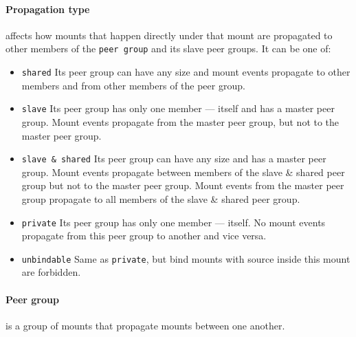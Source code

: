 \documentclass[licencjacka,en]{pracamgr}
\begin{document}
\paragraph{Propagation type} affects how mounts that happen directly under that mount are propagated to other members of the \texttt{peer group} and its slave peer groups. It can be one of:
\begin{itemize}
    \item \texttt{shared} Its peer group can have any size and mount events propagate to other members and from other members of the peer group.
    \item \texttt{slave} Its peer group has only one member --- itself and has a master peer group. Mount events propagate from the master peer group, but not to the master peer group.
    \item \texttt{slave \& shared} Its peer group can have any size and has a master peer group. Mount events propagate between members of the slave \& shared peer group but not to the master peer group. Mount events from the master peer group propagate to all members of the slave \& shared peer group.
    \item \texttt{private} Its peer group has only one member --- itself. No mount events propagate from this peer group to another and vice versa.
    \item \texttt{unbindable} Same as \texttt{private}, but bind mounts with source inside this mount are forbidden.
\end{itemize}

\paragraph{Peer group} is a group of mounts that propagate mounts between one another.
\end{document}
